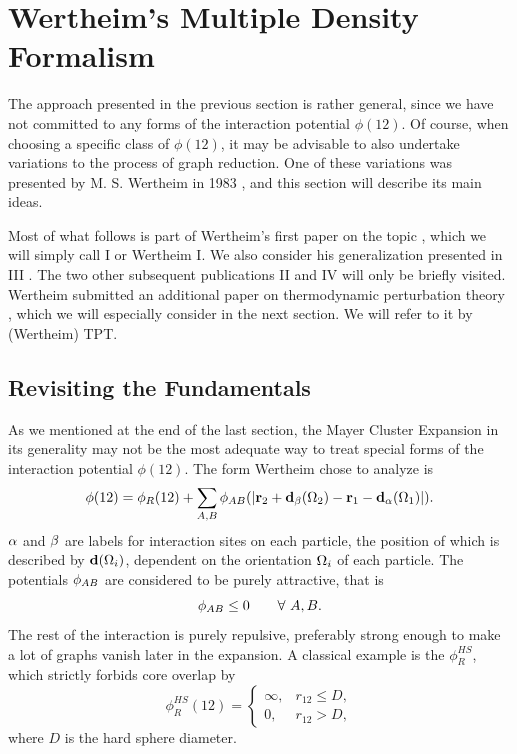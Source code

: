 \documentclass[8.5pt,twoside,twocolumn]{article}
\renewcommand\r{\bo r}
\newcommand\pab{\enmat{\phi_{AB}}}
\theoremstyle{standard}
\begin{document}
\section{Wertheim's Multiple Density Formalism}
\label{WH}
The approach presented in the previous section is rather general, since we have
not committed to any forms of the interaction potential $\phi(12)$. Of course, when
choosing a specific class of $\phi(12)$, it may be advisable to also undertake
variations to the process of graph reduction. One of these variations was
presented by M. S. Wertheim in 1983 \cite{Wertheim1}, and this section will
describe its main ideas.

Most of what follows is part of Wertheim's first paper on the topic
\cite{Wertheim1}, which we will simply call I or Wertheim I. We also consider
his generalization presented in III \cite{Wertheim3}. The two other subsequent
publications II \cite{Wertheim2} and IV \cite{Wertheim4} will only be briefly
visited. Wertheim submitted an additional paper on thermodynamic perturbation
theory \cite{WertheimTPT}, which we will especially consider in the next
section. We will refer to it by (Wertheim) TPT.

\subsection{Revisiting the Fundamentals}
\label{WH:RevFunda}

As we mentioned at the end of the last section, the Mayer Cluster Expansion in
its generality may not be the most adequate way to treat special forms of the
interaction potential $\phi(12)$. The form Wertheim chose to analyze is
\begin{equation}
\phi(12)=\phi_R(12)+\sum_{A,B} \phi_{AB}(\abs{\r_2+\bo d_\be(\Om_2)-\r_1-\bo d_\al(\Om_1)}).
\label{WH:phi12}
\end{equation}  
$\alpha$ and $\beta$ are labels for interaction sites on each particle, the position
of which is described by $\mathbf{d}(\Omega_i)$, dependent on the orientation $\Omega_i$
of each particle. The potentials $\pab$ are considered to be purely attractive,
that is
\begin{equation}
\pab \le 0 \qquad \forall\ A, B.
\label{WH:pabAttractive}
\end{equation} 
The rest of the interaction is purely repulsive, preferably strong enough to
make a lot of graphs vanish later in the expansion. A classical example is the
 $\phi_R^{HS}$, which strictly forbids core overlap by
\begin{equation}
\phi_R^{HS}(12)=\begin{cases}
\infty, &r_{12} \le D, \\
0, &r_{12} > D, 
\end{cases}
\label{WH:HS}
\end{equation}
where $D$ is the hard sphere diameter.
\end{document}
